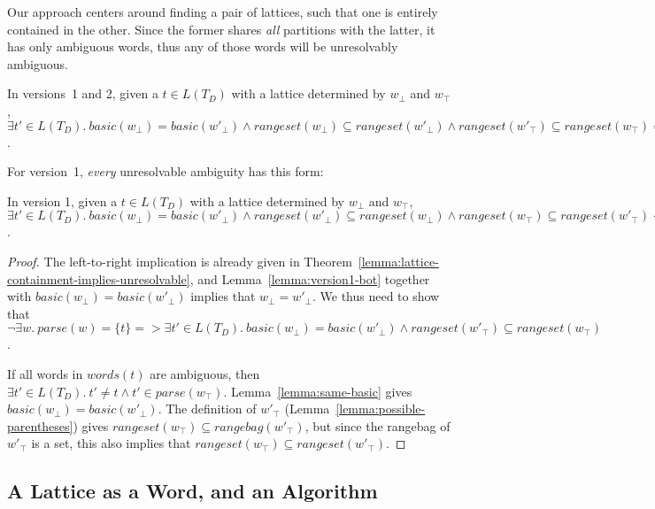 \documentclass[acmsmall,review,anonymous]{acmart}\settopmatter{printfolios=true,printccs=false,printacmref=false}
\newcommand{\parse}{\mathit{parse}} %
\newcommand{\words}{\mathit{words}} %
\newcommand{\alt}{\mathit{alt}} %
\newcommand{\basic}{\mathit{basic}} %
\newcommand{\rangebag}{\mathit{rangebag}} %
\newcommand{\rangeset}{\mathit{rangeset}} %
\begin{document}
Our approach centers around finding a pair of lattices, such that one is entirely contained in the other. Since the former shares \emph{all} partitions with the latter, it has only ambiguous words, thus any of those words will be unresolvably ambiguous.

\begin{theorem}
  In versions~1 and 2, given a $t \in L(T_D)$ with a lattice determined by $w_\bot$ and $w_\top$, $\exists t' \in L(T_D).\ \basic(w_\bot) = \basic(w'_\bot) \land \rangeset(w_\bot) \subseteq \rangeset(w'_\bot) \land \rangeset(w'_\top) \subseteq \rangeset(w_\top) => \neg \exists w.\ \parse(w) = \{t\}$. \label{lemma:lattice-containment-implies-unresolvable}
\end{theorem}


\noindent For version~1, \emph{every} unresolvable ambiguity has this form:

\begin{theorem}
  In version 1, given a $t \in L(T_D)$ with a lattice determined by $w_\bot$ and $w_\top$, $\exists t' \in L(T_D).\ \basic(w_\bot) = \basic(w'_\bot) \land \rangeset(w'_\bot) \subseteq \rangeset(w_\bot) \land \rangeset(w_\top) \subseteq \rangeset(w'_\top) <=> \neg \exists w.\ \parse(w) = \{t\}$.
\end{theorem}

\begin{proof}
  The left-to-right implication is already given in Theorem~\ref{lemma:lattice-containment-implies-unresolvable}, and Lemma~\ref{lemma:version1-bot} together with $\basic(w_\bot) = \basic(w'_\bot)$ implies that $w_\bot = w'_\bot$. We thus need to show that $\neg \exists w.\ \parse(w) = \{t\} => \exists t' \in L(T_D).\ \basic(w_\bot) = \basic(w'_\bot) \land \rangeset(w'_\top) \subseteq \rangeset(w_\top)$.

  If all words in $\words(t)$ are ambiguous, then $\exists t' \in L(T_D).\ t' \neq t \land t' \in \parse(w_\top)$. Lemma~\ref{lemma:same-basic} gives $\basic(w_\bot) = \basic(w'_\bot)$. The definition of $w'_\top$ (Lemma~\ref{lemma:possible-parentheses}) gives $\rangeset(w_\top) \subseteq \rangebag(w'_\top)$, but since the rangebag of $w'_\top$ is a set, this also implies that $\rangeset(w_\top) \subseteq \rangeset(w'_\top)$.
\end{proof}

\subsection{A Lattice as a Word, and an Algorithm} \label{sec:lattice-vpl}
\end{document}
